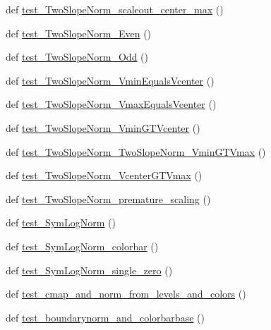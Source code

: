 \begin{DoxyCompactItemize}
def \hyperlink{namespacematplotlib_1_1tests_1_1test__colors_a771681a44d0e7b20160f2a9e6b6c36dd}{test\+\_\+\+Two\+Slope\+Norm\+\_\+scaleout\+\_\+center\+\_\+max} ()
\item 
def \hyperlink{namespacematplotlib_1_1tests_1_1test__colors_aad50f97326efeccff6e334d9f3bf4a45}{test\+\_\+\+Two\+Slope\+Norm\+\_\+\+Even} ()
\item 
def \hyperlink{namespacematplotlib_1_1tests_1_1test__colors_ad0a6d4c6464ca54482fabcef08fa41c3}{test\+\_\+\+Two\+Slope\+Norm\+\_\+\+Odd} ()
\item 
def \hyperlink{namespacematplotlib_1_1tests_1_1test__colors_a4c85a80a26c53ea6347decce7a2d49db}{test\+\_\+\+Two\+Slope\+Norm\+\_\+\+Vmin\+Equals\+Vcenter} ()
\item 
def \hyperlink{namespacematplotlib_1_1tests_1_1test__colors_a28ee438dfced342a2d483b94175da29f}{test\+\_\+\+Two\+Slope\+Norm\+\_\+\+Vmax\+Equals\+Vcenter} ()
\item 
def \hyperlink{namespacematplotlib_1_1tests_1_1test__colors_a565f1eb08362df00d190dc9a475effbe}{test\+\_\+\+Two\+Slope\+Norm\+\_\+\+Vmin\+G\+T\+Vcenter} ()
\item 
def \hyperlink{namespacematplotlib_1_1tests_1_1test__colors_a2873a1283572a300f0911dddf99e67c7}{test\+\_\+\+Two\+Slope\+Norm\+\_\+\+Two\+Slope\+Norm\+\_\+\+Vmin\+G\+T\+Vmax} ()
\item 
def \hyperlink{namespacematplotlib_1_1tests_1_1test__colors_a6ae49e822e25a269cee2cbe0f74e7311}{test\+\_\+\+Two\+Slope\+Norm\+\_\+\+Vcenter\+G\+T\+Vmax} ()
\item 
def \hyperlink{namespacematplotlib_1_1tests_1_1test__colors_ab552d5bc44d908bca4e86978ecbada61}{test\+\_\+\+Two\+Slope\+Norm\+\_\+premature\+\_\+scaling} ()
\item 
def \hyperlink{namespacematplotlib_1_1tests_1_1test__colors_af722bf316bf57f8b7ff3529b65cd5b9f}{test\+\_\+\+Sym\+Log\+Norm} ()
\item 
def \hyperlink{namespacematplotlib_1_1tests_1_1test__colors_ada85562ea6b66815f11e6c83f7086534}{test\+\_\+\+Sym\+Log\+Norm\+\_\+colorbar} ()
\item 
def \hyperlink{namespacematplotlib_1_1tests_1_1test__colors_a4289945ffad558ac19bcf49b7eb4f14f}{test\+\_\+\+Sym\+Log\+Norm\+\_\+single\+\_\+zero} ()
\item 
def \hyperlink{namespacematplotlib_1_1tests_1_1test__colors_ae62723397afc4b33e0af0676989f3f2d}{test\+\_\+cmap\+\_\+and\+\_\+norm\+\_\+from\+\_\+levels\+\_\+and\+\_\+colors} ()
\item 
def \hyperlink{namespacematplotlib_1_1tests_1_1test__colors_a0eaaae99eba0acd3b434dcc3bfd3f8ef}{test\+\_\+boundarynorm\+\_\+and\+\_\+colorbarbase} ()

\end{DoxyCompactItemize}

